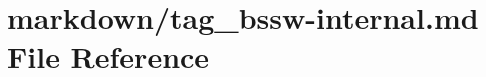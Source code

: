 \hypertarget{tag__bssw-internal_8md}{}\section{markdown/tag\+\_\+bssw-\/internal.md File Reference}
\label{tag__bssw-internal_8md}
